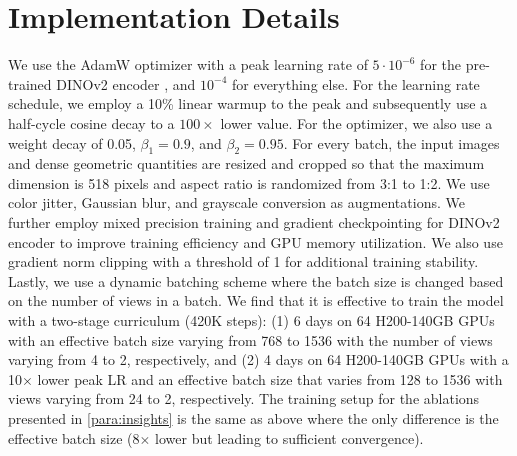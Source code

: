 \clearpage
\maketitlesupplementary
\appendix

\setcounter{section}{0}
\setcounter{equation}{0}
\setcounter{figure}{0}
\setcounter{table}{0}
\renewcommand{\thefigure}{S.\arabic{figure}}
\renewcommand{\thetable}{S.\arabic{table}}
\renewcommand{\theequation}{S.\arabic{equation}}








\vspace{-0.8em}

\section{Implementation Details}

We use the AdamW \cite{KingmB2015} optimizer with a peak learning rate of $5\cdot10^{-6}$ for the pre-trained DINOv2 encoder \cite{OquabDMVSKFHMEABGHHLMRSSXJMLJB2024}, and $10^{-4}$ for everything else.
For the learning rate schedule, we employ a 10\% linear warmup to the peak and subsequently use a half-cycle cosine decay to a $100\times$ lower value.
For the optimizer, we also use a weight decay of 0.05, $\beta_1 \!=\! 0.9$, and $\beta_2 \!=\! 0.95$.
For every batch, the input images and dense geometric quantities are resized and cropped so that the maximum dimension is 518 pixels and aspect ratio is randomized from 3:1 to 1:2.
We use color jitter, Gaussian blur, and grayscale conversion as augmentations.
We further employ mixed precision training and gradient checkpointing for DINOv2 encoder to improve training efficiency and GPU memory utilization.
We also use gradient norm clipping with a threshold of 1 for additional training stability.
Lastly, we use a dynamic batching scheme where the batch size is changed based on the number of views in a batch.
We find that it is effective to train the model with a two-stage curriculum (420K steps):
(1) 6 days on 64 H200-140GB GPUs with an effective batch size varying from 768 to 1536 with the number of views varying from 4 to 2, respectively, and
(2) 4 days on 64 H200-140GB GPUs with a 10$\times$ lower peak LR and an effective batch size that varies from 128 to 1536 with views varying from 24 to 2, respectively.
The training setup for the ablations presented in \cref{para:insights} is the same as above where the only difference is the effective batch size (8$\times$ lower but leading to sufficient convergence).

\vspace{-0.7em}

